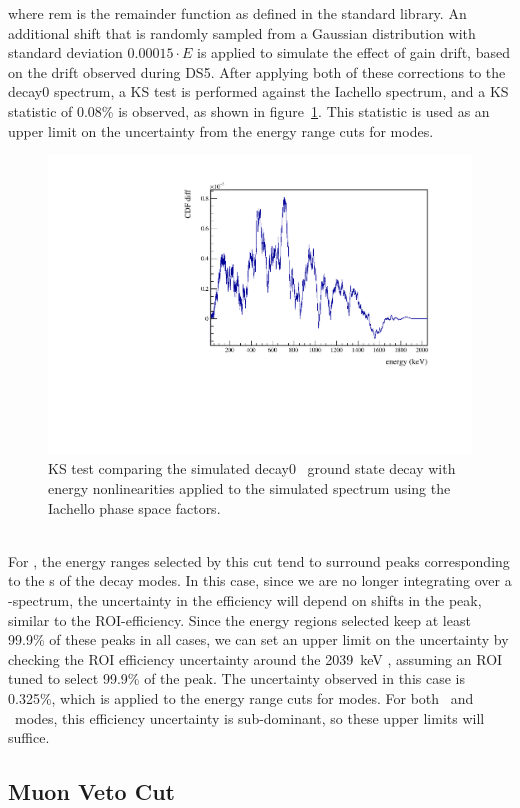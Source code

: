 \documentclass[/main.tex]{subfiles}
\begin{document}
where $\mathrm{rem}$ is the remainder function as defined in the \cpp standard library.
An additional shift that is randomly sampled from a Gaussian distribution with standard deviation $0.00015\cdot E$ is applied to simulate the effect of gain drift, based on the drift observed during DS5.
After applying both of these corrections to the decay0 spectrum, a KS test is performed against the Iachello spectrum, and a KS statistic of 0.08\% is observed, as shown in figure~\ref{fig:decay0NLCks}.
This statistic is used as an upper limit on the uncertainty from the energy range cuts for \tnbb modes.
\begin{figure}[h]
  \centering
  \includegraphics[width=0.6\linewidth]{decay0KS}
  \caption[KS Test of decay0 spectrum with energy non-linearities vs Iachello spectrum]{\label{fig:decay0NLCks}
    KS test comparing the simulated decay0 \tnbb\ ground state decay with energy nonlinearities applied to the simulated spectrum using the Iachello phase space factors.
  }
\end{figure}
\\
For \znbb, the energy ranges selected by this cut tend to surround peaks corresponding to the \Qbb s of the decay modes.
In this case, since we are no longer integrating over a \bb -spectrum, the uncertainty in the efficiency will depend on shifts in the peak, similar to the ROI-efficiency.
Since the energy regions selected keep at least 99.9\% of these peaks in all cases, we can set an upper limit on the uncertainty by checking the ROI efficiency uncertainty around the 2039~keV \Qbb, assuming an ROI tuned to select 99.9\% of the peak.
The uncertainty observed in this case is 0.325\%, which is applied to the energy range cuts for \znbb modes.
For both \znbb\ and \tnbb\ modes, this efficiency uncertainty is sub-dominant, so these upper limits will suffice.
\\
\subsection{Muon Veto Cut}
\end{document}
